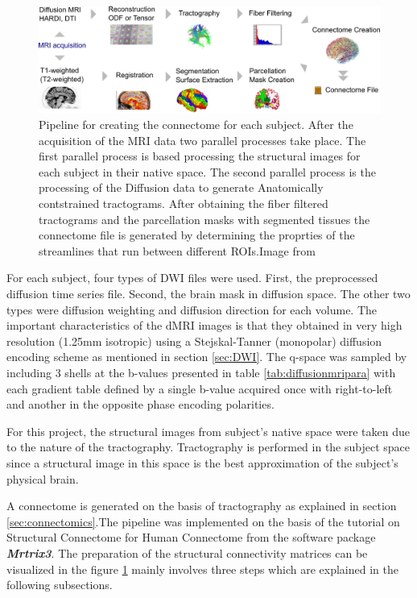 \documentclass[msthesis.tex]{subfiles}
\begin{document}
\begin{figure}
    \centering
    \includegraphics[width=\textwidth]{images/connectome_creation_workflow.png}
    \caption{Pipeline for creating the connectome for each subject. After the acquisition of the MRI data two parallel processes take place. The first parallel process is based processing the structural images for each subject in their native space. The second parallel process is the processing of the Diffusion data to generate Anatomically contstrained tractograms. After obtaining the fiber filtered tractograms and the parcellation masks with segmented tissues the connectome file is generated by determining the proprties of the streamlines that run between different ROIs.Image from \cite{gerhard2011connectome}}
    \label{fig:connectome_pipeline}
\end{figure}


For each subject, four types of  DWI files were used. First, the preprocessed diffusion time series file. Second, the brain mask in diffusion space. The other two types were diffusion weighting and diffusion direction for each volume. The important characteristics of the dMRI images is that they obtained in very high resolution (1.25mm isotropic) using a Stejskal-Tanner (monopolar) diffusion encoding scheme as mentioned in section \ref{sec:DWI}. The q-space was sampled by including 3 shells at the b-values presented in table \ref{tab:diffusionmripara} with each gradient table defined by a single b-value acquired once with right-to-left and another in the opposite phase encoding polarities. 

For this project, the structural images from subject's native space were taken due to the nature of the tractography. Tractography is performed in the subject space since a structural image in this space is the best approximation of the subject's physical brain. 



A connectome is generated on the basis of tractography as explained in section \ref{sec:connectomics}.The pipeline was implemented on the basis of the tutorial on Structural Connectome for Human Connectome from the software package \textbf{\textit{Mrtrix3}}. The preparation of the structural connectivity matrices can be visualized in the figure \ref{fig:connectome_pipeline} mainly involves three steps which are explained in the following subsections.
\end{document}
